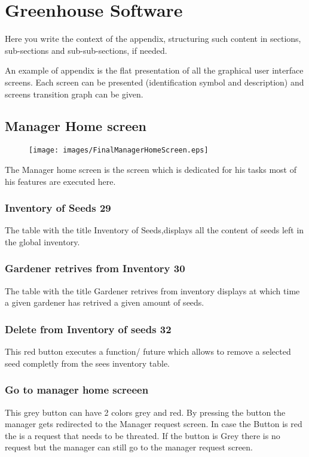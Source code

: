 \chapter{Greenhouse Software}
\label{chap:appendix}


Here you write the context of the appendix, structuring such content in
sections, sub-sections and sub-sub-sections, if needed.

An example of appendix is the flat presentation of all the graphical user interface screens.
Each screen can be presented (identification symbol and description) and screens transition graph can be given.






\section{Manager Home screen}
\label{sec:appendix_Manager_Home_Screen}

\begin{figure}[H]
\texttt{[image: images/FinalManagerHomeScreen.eps]}
\end{figure}

The Manager home screen is the screen which is dedicated for his tasks most of
his features are executed here.


\subsection{Inventory of Seeds 29}
The table with the title Inventory of Seeds,displays all the content of seeds
left in the global inventory.

\subsection{Gardener retrives from Inventory 30}
The table with the title Gardener retrives from inventory displays at which time
a given gardener has retrived a given amount of seeds.

\subsection{Delete from Inventory of seeds 32}
This red button executes a function/ future which allows to remove a selected
seed completly from the sees inventory table.

\subsection{Go to manager home screeen}
This grey button can have 2 colors grey and red. By pressing the button the
manager gets redirected to the Manager request screen. In case the Button is red
the is a request that needs to be threated. If the button is Grey there is no
request but the manager can still go to the manager request screen.

